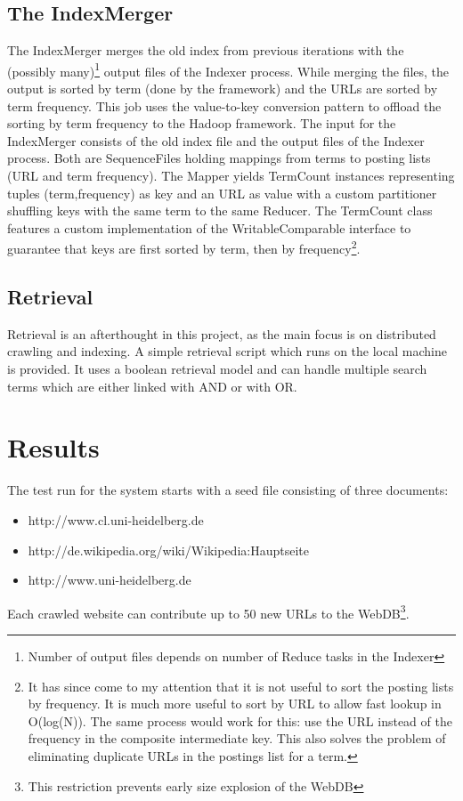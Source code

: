 \documentclass[10pt,a4paper]{report}
\begin{document}
\subsection*{The IndexMerger}
The IndexMerger merges the old index from previous iterations with the (possibly many)\footnote{Number of output files depends on number of Reduce tasks in the Indexer} output files of the Indexer process. While merging the files, the output is sorted by term (done by the framework) and the URLs are sorted by term frequency. This job
uses the value-to-key conversion pattern to offload the sorting by term frequency to the Hadoop framework.
The input for the IndexMerger consists of the old index file and the output files of the Indexer process.
Both are SequenceFiles holding mappings from terms to posting lists (URL and term frequency).
The Mapper yields TermCount instances representing tuples (term,frequency) as key and an URL as value with a custom partitioner shuffling keys with the same term to the same Reducer.
The TermCount class features a custom implementation of the WritableComparable interface to guarantee that keys are first sorted by term,
then by frequency\footnote{It has since come to my attention that it is not useful to sort the posting lists by frequency.
It is much more useful to sort by URL to allow fast lookup in O(log(N)).
The same process would work for this: use the URL instead of the frequency in the composite intermediate key. This also solves the problem of eliminating duplicate URLs in the postings list for a term.}.

\subsection*{Retrieval}
Retrieval is an afterthought in this project, as the main focus is on distributed crawling and indexing. A simple retrieval script
which runs on the local machine is provided. It uses a boolean retrieval model and can handle multiple search terms
which are either linked with AND or with OR.
\section*{Results}
The test run for the system starts with a seed file consisting of three documents:
\begin{itemize}
\item  http://www.cl.uni-heidelberg.de
\item http://de.wikipedia.org/wiki/Wikipedia:Hauptseite
\item http://www.uni-heidelberg.de
\end{itemize}
Each crawled website can contribute up to 50 new URLs to the WebDB\footnote{This restriction prevents early size explosion of the WebDB}.
\end{document}
